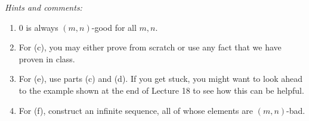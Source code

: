 \documentclass[12pt]{article}
\begin{document}
	{\em \small Hints and comments: \begin{enumerate}[1.]\item $0$ is always $(m,n)$-good for all $m,n.$

	\item For (c), you may either prove from scratch or use any fact that we have proven in class.

	\item For (e), use parts (c) and (d). If you get stuck, you might want to look ahead to the example shown at the end of Lecture 18 to see how this can be helpful.

	\item For (f), construct an infinite sequence, all of whose elements are $(m,n)$-bad.\end{enumerate} }
\end{document}
